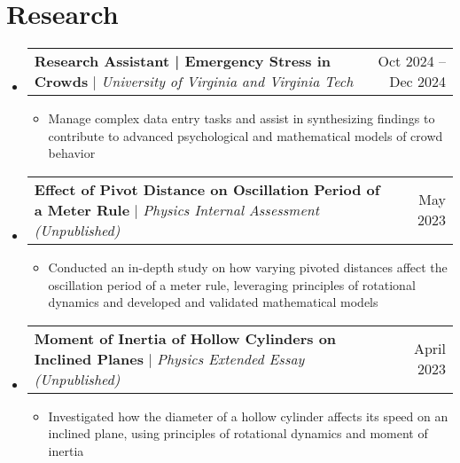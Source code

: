 \documentclass[a4paper,11pt]{article}
\makeatletter
\newcommand{\resumeItem}[1]{
  \item\small{
    {#1 \vspace{-2pt}}
  }
}
\newcommand{\resumeProjectHeading}[2]{
    \item
    \begin{tabular*}{0.97\textwidth}{l@{\extracolsep{\fill}}r}
      \small#1 & #2 \\
    \end{tabular*}\vspace{-7pt}
}
\newcommand{\resumeSubHeadingListStart}{\begin{itemize}[leftmargin=0.15in, label={}]}
\newcommand{\resumeSubHeadingListEnd}{\end{itemize}}
\newcommand{\resumeItemListStart}{\begin{itemize}}
\newcommand{\resumeItemListEnd}{\end{itemize}\vspace{-5pt}}
\makeatother
\begin{document}
\section{Research}
  \resumeSubHeadingListStart
      \resumeProjectHeading
        {\textbf{Research Assistant | Emergency Stress in Crowds} $|$ \emph{University of Virginia and Virginia Tech}} {Oct 2024 -- Dec 2024}
        \resumeItemListStart
         \resumeItem{Manage complex data entry tasks and assist in synthesizing findings to contribute to advanced psychological and mathematical models of crowd behavior}
        \resumeItemListEnd
      \resumeProjectHeading
        {\textbf{Effect of Pivot Distance on Oscillation Period of a Meter Rule} $|$ \emph{Physics Internal Assessment (Unpublished)}} {May 2023}
        \resumeItemListStart
         \resumeItem{Conducted an in-depth study on how varying pivoted distances affect the oscillation period of a meter rule, leveraging principles of rotational dynamics and developed and validated mathematical models}
        \resumeItemListEnd
      \resumeProjectHeading
        {\textbf{Moment of Inertia of Hollow Cylinders on Inclined Planes} $|$ \emph{Physics Extended Essay (Unpublished)}} {April 2023}
        \resumeItemListStart
         \resumeItem{Investigated how the diameter of a hollow cylinder affects its speed on an inclined plane, using principles of rotational dynamics and moment of inertia}
        \resumeItemListEnd
  \resumeSubHeadingListEnd
\end{document}
